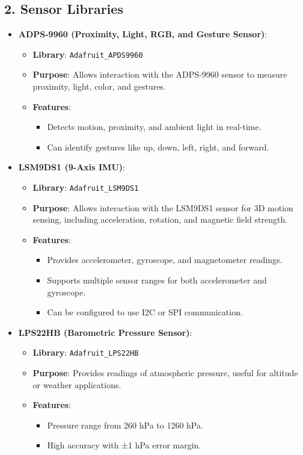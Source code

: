 	\subsection*{2. Sensor Libraries}
	
	\begin{itemize}
		\item \textbf{ADPS-9960 (Proximity, Light, RGB, and Gesture Sensor)}:
		\begin{itemize}
			\item \textbf{Library}: \texttt{Adafruit\_APDS9960}
			\item \textbf{Purpose}: Allows interaction with the ADPS-9960 sensor to measure proximity, light, color, and gestures.
			\item \textbf{Features}:
			\begin{itemize}
				\item Detects motion, proximity, and ambient light in real-time.
				\item Can identify gestures like up, down, left, right, and forward.
			\end{itemize}
		\end{itemize}
		
		\item \textbf{LSM9DS1 (9-Axis IMU)}:
		\begin{itemize}
			\item \textbf{Library}: \texttt{Adafruit\_LSM9DS1}
			\item \textbf{Purpose}: Allows interaction with the LSM9DS1 sensor for 3D motion sensing, including acceleration, rotation, and magnetic field strength.
			\item \textbf{Features}:
			\begin{itemize}
				\item Provides accelerometer, gyroscope, and magnetometer readings.
				\item Supports multiple sensor ranges for both accelerometer and gyroscope.
				\item Can be configured to use I2C or SPI communication.
			\end{itemize}
		\end{itemize}
		
		\item \textbf{LPS22HB (Barometric Pressure Sensor)}:
		\begin{itemize}
			\item \textbf{Library}: \texttt{Adafruit\_LPS22HB}
			\item \textbf{Purpose}: Provides readings of atmospheric pressure, useful for altitude or weather applications.
			\item \textbf{Features}:
			\begin{itemize}
				\item Pressure range from 260 hPa to 1260 hPa.
				\item High accuracy with ±1 hPa error margin.
			\end{itemize}
		\end{itemize}
		

\end{itemize}
